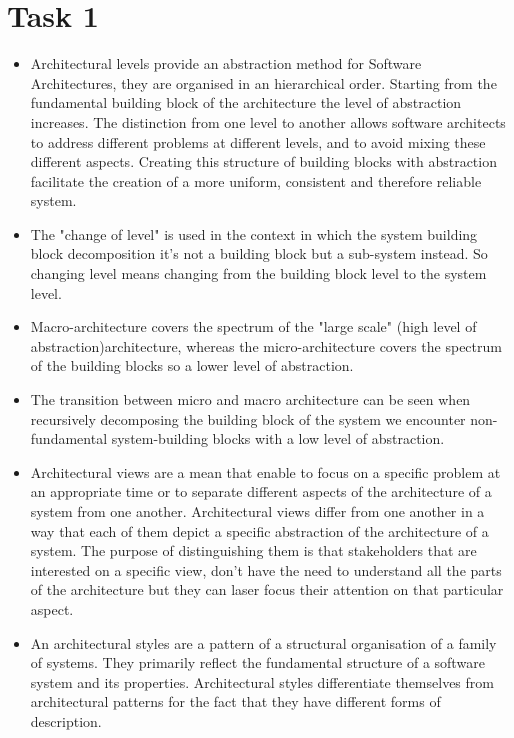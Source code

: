 \chapter{Task 1}
\begin{itemize}
	\item Architectural levels provide an abstraction method for Software Architectures, they are organised in an hierarchical order. Starting from the fundamental building block of the architecture the level of abstraction increases. The distinction from one level to another allows software architects to address different problems at different levels, and to avoid mixing these different aspects. Creating this structure of building blocks with abstraction facilitate the creation of a more uniform, consistent and therefore reliable system.
	\item The "change of level" is used in the context in which the system building block decomposition it's not a building block but a sub-system instead. So changing level means changing from the building block level to the system level.
	\item Macro-architecture covers the spectrum of the "large scale" (high level of abstraction)architecture, whereas the micro-architecture covers the spectrum of the building blocks so a lower level of abstraction.
	\item The transition between micro and macro architecture can be seen when recursively decomposing the building block of the system we encounter non-fundamental system-building blocks with a low level of abstraction.
	\item Architectural views are a mean that enable to focus on a specific problem at an appropriate time or to separate different aspects of the architecture of a system from one another. Architectural views differ from one another in a way that each of them depict a specific abstraction of the architecture of a system. The purpose of distinguishing them is that stakeholders that are interested on a specific view, don't have the need to understand all the parts of the architecture but they can laser focus their attention on that particular aspect.
	\item An architectural styles are a pattern of a structural organisation of a family of systems. They primarily reflect the fundamental structure of a software system and its properties. Architectural styles differentiate themselves from architectural patterns for the fact that they have different forms of description.
\end{itemize}